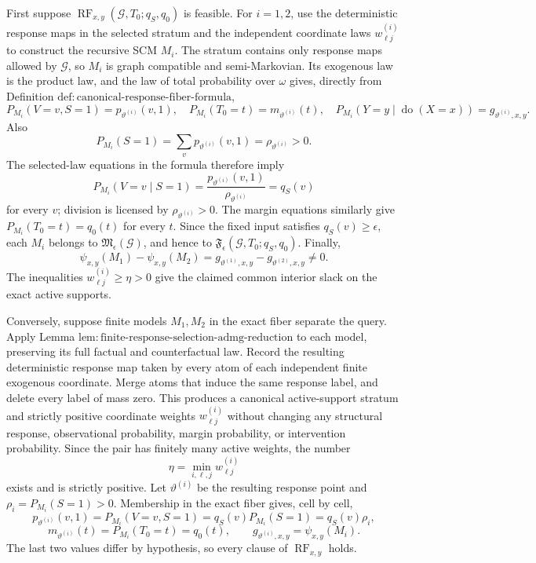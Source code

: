 First suppose \(\operatorname{RF}_{x,y}(\mathcal G,T_0;q_S,q_0)\) is feasible.  For \(i=1,2\), use the deterministic response maps in the selected stratum and the independent coordinate laws \(w^{(i)}_{\ell j}\) to construct the recursive SCM \(M_i\).  The stratum contains only response maps allowed by \(\mathcal G\), so \(M_i\) is graph compatible and semi-Markovian.  Its exogenous law is the product law, and the law of total probability over \(\omega\) gives, directly from Definition \(\mathrm{def{:}canonical\text{-}response\text{-}fiber\text{-}formula}\),
\[
 P_{M_i}(V=v,S=1)=p_{\vartheta^{(i)}}(v,1),
 \quad
 P_{M_i}(T_0=t)=m_{\vartheta^{(i)}}(t),
 \quad
 P_{M_i}(Y=y\mid\operatorname{do}(X=x))=g_{\vartheta^{(i)},x,y}.
\]
Also
\[
 P_{M_i}(S=1)=\sum_vp_{\vartheta^{(i)}}(v,1)
 =\rho_{\vartheta^{(i)}}>0.
\]
The selected-law equations in the formula therefore imply
\[
 P_{M_i}(V=v\mid S=1)
 =\frac{p_{\vartheta^{(i)}}(v,1)}{\rho_{\vartheta^{(i)}}}
 =q_S(v)
\]
for every \(v\); division is licensed by \(\rho_{\vartheta^{(i)}}>0\).  The margin equations similarly give \(P_{M_i}(T_0=t)=q_0(t)\) for every \(t\).  Since the fixed input satisfies \(q_S(v)\geq\epsilon\), each \(M_i\) belongs to \(\mathfrak M_{\epsilon}(\mathcal G)\), and hence to \(\mathfrak F_{\epsilon}(\mathcal G,T_0;q_S,q_0)\).  Finally,
\[
 \psi_{x,y}(M_1)-\psi_{x,y}(M_2)
 =g_{\vartheta^{(1)},x,y}-g_{\vartheta^{(2)},x,y}\neq0.
\]
The inequalities \(w^{(i)}_{\ell j}\geq\eta>0\) give the claimed common interior slack on the exact active supports.

Conversely, suppose finite models \(M_1,M_2\) in the exact fiber separate the query.  Apply Lemma \(\mathrm{lem{:}finite\text{-}response\text{-}selection\text{-}admg\text{-}reduction}\) to each model, preserving its full factual and counterfactual law.  Record the resulting deterministic response map taken by every atom of each independent finite exogenous coordinate.  Merge atoms that induce the same response label, and delete every label of mass zero.  This produces a canonical active-support stratum and strictly positive coordinate weights \(w^{(i)}_{\ell j}\) without changing any structural response, observational probability, margin probability, or intervention probability.  Since the pair has finitely many active weights, the number
\[
 \eta=\min_{i,\ell,j}w^{(i)}_{\ell j}
\]
exists and is strictly positive.  Let \(\vartheta^{(i)}\) be the resulting response point and \(\rho_i=P_{M_i}(S=1)>0\).  Membership in the exact fiber gives, cell by cell,
\[
 p_{\vartheta^{(i)}}(v,1)
 =P_{M_i}(V=v,S=1)
 =q_S(v)P_{M_i}(S=1)
 =q_S(v)\rho_i,
\]
\[
 m_{\vartheta^{(i)}}(t)=P_{M_i}(T_0=t)=q_0(t),
 \qquad
 g_{\vartheta^{(i)},x,y}=\psi_{x,y}(M_i).
\]
The last two values differ by hypothesis, so every clause of \(\operatorname{RF}_{x,y}\) holds.

